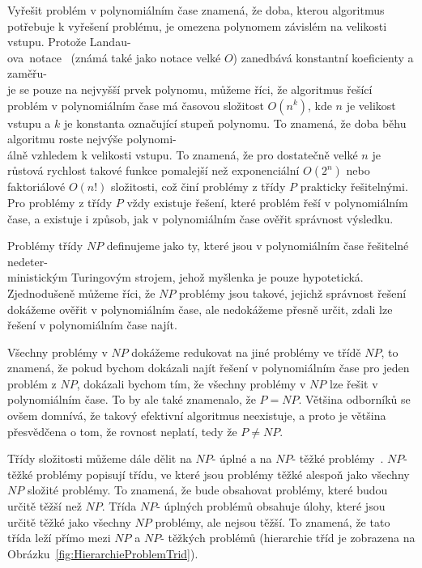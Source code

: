 Vyřešit problém v polynomiálním čase znamená, že doba, kterou algoritmus potřebuje k vyřešení problému, je omezena polynomem závislém na velikosti vstupu. Protože Landau-\\ova~notace~\cite{BigONotationGFG} (známá také jako notace velké \(O\)) zanedbává konstantní koeficienty a zaměřu-\\je se pouze na nejvyšší prvek polynomu, můžeme říci, že algoritmus řešící problém v polynomiálním čase má časovou složitost \(O(n^k)\), kde \(n\) je velikost vstupu a \(k\) je konstanta označující stupeň polynomu. To znamená, že doba běhu algoritmu roste nejvýše polynomi-\\álně vzhledem k velikosti vstupu. To znamená, že pro dostatečně velké \(n\) je růstová rychlost takové funkce pomalejší než exponenciální \(O(2^n)\) nebo faktoriálové \(O(n!)\) složitosti, což činí problémy z třídy \(P\) prakticky řešitelnými. Pro problémy z třídy \(P\) vždy existuje řešení, které problém řeší v polynomiálním čase, a existuje i způsob, jak v polynomiálním čase ověřit správnost výsledku. 

Problémy třídy \(NP\) definujeme jako ty, které jsou v polynomiálním čase řešitelné nedeter-\\ministickým Turingovým strojem, jehož myšlenka je pouze hypotetická. Zjednodušeně můžeme říci, že \(NP\) problémy jsou takové, jejichž správnost řešení dokážeme ověřit v polynomiálním čase, ale nedokážeme přesně určit, zdali lze řešení v polynomiálním čase najít.

Všechny problémy v \(NP\) dokážeme redukovat na jiné problémy ve třídě \(NP\), to znamená, že pokud bychom dokázali najít řešení v polynomiálním čase pro jeden problém z \(NP\), dokázali bychom tím, že všechny problémy v \(NP\) lze řešit v polynomiálním čase. To by ale také znamenalo, že \(P = NP\). Většina odborníků se ovšem domnívá, že takový efektivní algoritmus neexistuje, a proto je většina přesvědčena o tom, že rovnost neplatí, tedy že  $P \neq NP$.

Třídy složitosti můžeme dále dělit na \(NP\)- úplné a na \(NP\)- těžké problémy~\cite{demaine2016complexity}. \(NP\)- těžké problémy popisují třídu, ve které jsou problémy těžké alespoň jako všechny \(NP\) složité problémy. To znamená, že bude obsahovat problémy, které budou určitě těžší než \(NP\). Třída \(NP\)- úplných problémů obsahuje úlohy, které jsou určitě těžké jako všechny \(NP\) problémy, ale nejsou těžší. To znamená, že tato třída leží přímo mezi \(NP\) a \(NP\)- těžkých problémů (hierarchie tříd je zobrazena na Obrázku~\ref{fig:HierarchieProblemTrid}).

